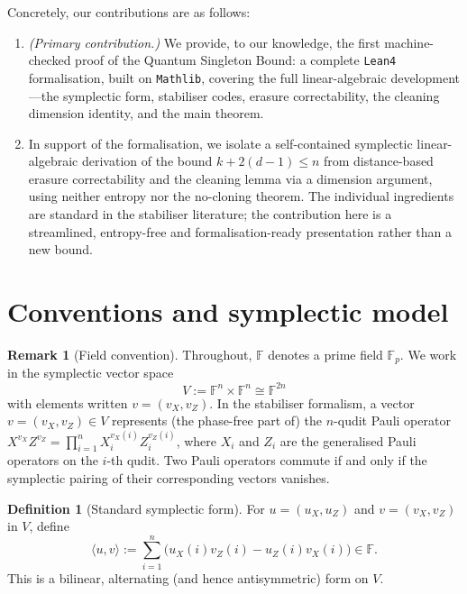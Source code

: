 \documentclass[11pt]{article}
\theoremstyle{plain}
\theoremstyle{definition}
\newtheorem{definition}{Definition}
\newtheorem{remark}{Remark}
\newcommand{\F}{\mathbb{F}}
\begin{document}
Concretely, our contributions are as follows:
\begin{enumerate}[label=(\roman*)]
  \item \emph{(Primary contribution.)}  We provide, to our knowledge, the first machine-checked
        proof of the Quantum Singleton Bound: a complete \texttt{Lean4} formalisation, built on
        \texttt{Mathlib}, covering the full linear-algebraic development---the symplectic form,
        stabiliser codes, erasure correctability, the cleaning dimension identity, and the main
        theorem.
  \item In support of the formalisation, we isolate a self-contained symplectic
        linear-algebraic derivation of the bound $k + 2(d-1) \le n$ from distance-based erasure
        correctability and the cleaning lemma via a dimension argument, using neither entropy
        nor the no-cloning theorem.  The individual ingredients are standard in the stabiliser
        literature; the contribution here is a streamlined, entropy-free and
        formalisation-ready presentation rather than a new bound.
\end{enumerate}


\section{Conventions and symplectic model}\label{sec:symplectic}

\begin{remark}[Field convention]
Throughout, $\F$ denotes a prime field $\F_p$.  We work in the symplectic vector space
\[
  V := \F^n \times \F^n \cong \F^{2n}
\]
with elements written $v = (v_X, v_Z)$.  In the stabiliser formalism, a vector
$v = (v_X, v_Z) \in V$ represents (the phase-free part of) the $n$-qudit Pauli operator
$X^{v_X} Z^{v_Z} = \prod_{i=1}^n X_i^{v_X(i)} Z_i^{v_Z(i)}$, where $X_i$ and $Z_i$ are the
generalised Pauli operators on the $i$-th qudit.  Two Pauli operators commute if and only if
the symplectic pairing of their corresponding vectors vanishes.
\end{remark}

\begin{definition}[Standard symplectic form]
For $u = (u_X, u_Z)$ and $v = (v_X, v_Z)$ in $V$, define
\[
  \langle u, v \rangle := \sum_{i=1}^n \bigl( u_X(i) v_Z(i) - u_Z(i) v_X(i) \bigr) \in \F.
\]
This is a bilinear, alternating (and hence antisymmetric) form on $V$.
\end{definition}
\end{document}
